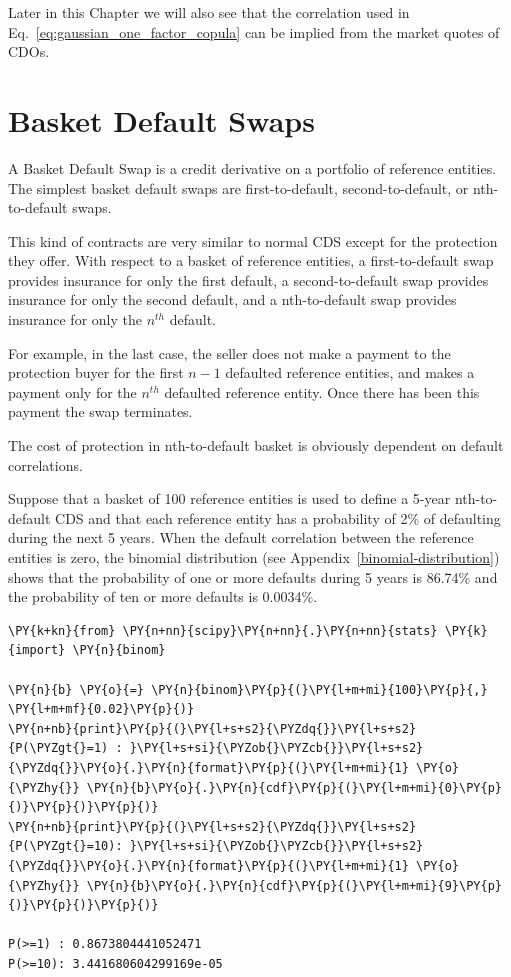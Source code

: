 Later in this Chapter we will also see that the correlation used in Eq.~\ref{eq:gaussian_one_factor_copula} can be implied from the market quotes of CDOs.

\section{Basket Default Swaps}\label{basket-default-swaps}

A Basket Default Swap is a credit derivative on a portfolio of reference
entities. The simplest basket default swaps are first-to-default,
second-to-default, or nth-to-default swaps. 

This kind of contracts are very similar to normal CDS except for the protection they offer.
With respect to a basket of reference entities, a first-to-default swap provides insurance for only the first default, a second-to-default swap provides insurance
for only the second default, and a nth-to-default swap provides insurance for only the $n^{th}$ default. 

For example, in the last case, the
seller does not make a payment to the protection buyer for
the first $n-1$ defaulted reference entities, and makes a payment only for the
$n^{th}$ defaulted reference entity. Once there has been this payment the swap terminates.

The cost of protection in nth-to-default basket is obviously dependent on default correlations. 

Suppose that a basket of 100 reference entities is used to define a 5-year nth-to-default CDS and that each reference entity has a probability of 2\% of defaulting during the next
5 years. When the default correlation between the reference entities is zero, the binomial distribution (see Appendix~\ref{binomial-distribution}) 
shows that the probability of one or more defaults during 5 years is 86.74\% and the probability of ten or more defaults is 0.0034\%.

\begin{tcolorbox}[breakable, size=fbox, boxrule=1pt, pad at break*=1mm,colback=cellbackground, colframe=cellborder]
\begin{Verbatim}[commandchars=\\\{\}]
\PY{k+kn}{from} \PY{n+nn}{scipy}\PY{n+nn}{.}\PY{n+nn}{stats} \PY{k}{import} \PY{n}{binom}
	
\PY{n}{b} \PY{o}{=} \PY{n}{binom}\PY{p}{(}\PY{l+m+mi}{100}\PY{p}{,} \PY{l+m+mf}{0.02}\PY{p}{)}
\PY{n+nb}{print}\PY{p}{(}\PY{l+s+s2}{\PYZdq{}}\PY{l+s+s2}{P(\PYZgt{}=1) : }\PY{l+s+si}{\PYZob{}\PYZcb{}}\PY{l+s+s2}{\PYZdq{}}\PY{o}{.}\PY{n}{format}\PY{p}{(}\PY{l+m+mi}{1} \PY{o}{\PYZhy{}} \PY{n}{b}\PY{o}{.}\PY{n}{cdf}\PY{p}{(}\PY{l+m+mi}{0}\PY{p}{)}\PY{p}{)}\PY{p}{)}
\PY{n+nb}{print}\PY{p}{(}\PY{l+s+s2}{\PYZdq{}}\PY{l+s+s2}{P(\PYZgt{}=10): }\PY{l+s+si}{\PYZob{}\PYZcb{}}\PY{l+s+s2}{\PYZdq{}}\PY{o}{.}\PY{n}{format}\PY{p}{(}\PY{l+m+mi}{1} \PY{o}{\PYZhy{}} \PY{n}{b}\PY{o}{.}\PY{n}{cdf}\PY{p}{(}\PY{l+m+mi}{9}\PY{p}{)}\PY{p}{)}\PY{p}{)}
	
P(>=1) : 0.8673804441052471
P(>=10): 3.441680604299169e-05
\end{Verbatim}
\end{tcolorbox}

